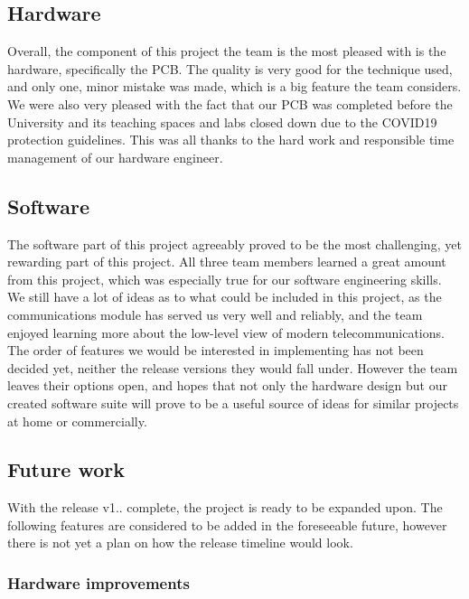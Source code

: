 \subsection*{Hardware}

Overall, the component of this project the team is the most pleased with is the hardware, specifically the P\+CB. The quality is very good for the technique used, and only one, minor mistake was made, which is a big feature the team considers. We were also very pleased with the fact that our P\+CB was completed before the University and its teaching spaces and labs closed down due to the C\+O\+V\+I\+D19 protection guidelines. This was all thanks to the hard work and responsible time management of our hardware engineer.

\subsection*{Software}

The software part of this project agreeably proved to be the most challenging, yet rewarding part of this project. All three team members learned a great amount from this project, which was especially true for our software engineering skills. We still have a lot of ideas as to what could be included in this project, as the communications module has served us very well and reliably, and the team enjoyed learning more about the low-\/level view of modern telecommunications. The order of features we would be interested in implementing has not been decided yet, neither the release versions they would fall under. However the team leaves their options open, and hopes that not only the hardware design but our created software suite will prove to be a useful source of ideas for similar projects at home or commercially.

\subsection*{Future work}

With the release v1.. complete, the project is ready to be expanded upon. The following features are considered to be added in the foreseeable future, however there is not yet a plan on how the release timeline would look.

\subsubsection*{Hardware improvements}

